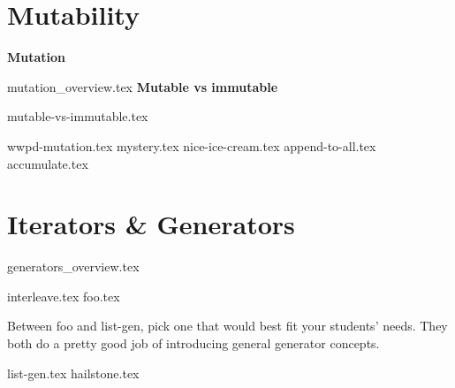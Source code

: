 \documentclass{exam}
\begin{document}
\section{Mutability}
	\textbf{Mutation}

	{mutation_overview.tex}
	\textbf{Mutable vs immutable}

	{mutable-vs-immutable.tex}
	\begin{questions}
		{wwpd-mutation.tex}
		\newpage
		{mystery.tex}
		\newpage
    {nice-ice-cream.tex}
    \newpage
    {append-to-all.tex}
    {accumulate.tex}
	\end{questions}

\section{Iterators \& Generators}
{generators_overview.tex}
\begin{questions}
{interleave.tex}
{foo.tex}
\begin{questionmeta}
    Between foo and list-gen, pick one that would best fit your students' needs. They both do a pretty good job of introducing general generator concepts.
\end{questionmeta}
{list-gen.tex}
{hailstone.tex}

\end{questions}
\end{document}

